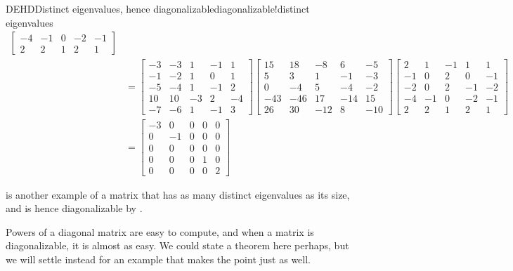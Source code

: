\begin{example}{DEHD}{Distinct eigenvalues, hence diagonalizable}{diagonalizable!distinct eigenvalues}
\begin{align*}
\begin{bmatrix}
-4 & -1 & 0 & -2 & -1\\
2 & 2 & 1 & 2 & 1
\end{bmatrix}\\
%
&=
\begin{bmatrix}
-3 & -3 & 1 & -1 & 1\\
-1 & -2 & 1 & 0 & 1\\
-5 & -4 & 1 & -1 & 2\\
10 & 10 & -3 & 2 & -4\\
-7 & -6 & 1 & -1 & 3
\end{bmatrix}
\begin{bmatrix}
15 & 18 & -8 & 6 & -5\\ 
5 & 3 & 1 & -1 & -3\\ 
0 & -4 & 5 & -4 & -2\\ 
-43 & -46 & 17 & -14 & 15\\ 
26 & 30 & -12 & 8 & -10
\end{bmatrix}
\begin{bmatrix}
2 & 1 & -1 & 1 & 1\\
-1 & 0 & 2 & 0 & -1\\
-2 & 0 & 2 & -1 & -2\\
-4 & -1 & 0 & -2 & -1\\
2 & 2 & 1 & 2 & 1
\end{bmatrix}\\
%
&=
\begin{bmatrix}
-3 & 0 & 0 & 0 & 0\\
0 & -1 & 0 & 0 & 0\\
0 & 0 & 0 & 0 & 0\\
0 & 0 & 0 & 1 & 0\\
0 & 0 & 0 & 0 & 2
\end{bmatrix}
%
\end{align*}
%
\end{example}
%
 is another example of a matrix that has as many distinct eigenvalues as its size, and is hence diagonalizable by .\par
%
Powers of a diagonal matrix are easy to compute, and when a matrix is diagonalizable, it is almost as easy.  We could state a theorem here perhaps, but we will settle instead for an example that makes the point just as well.\par
%
%
